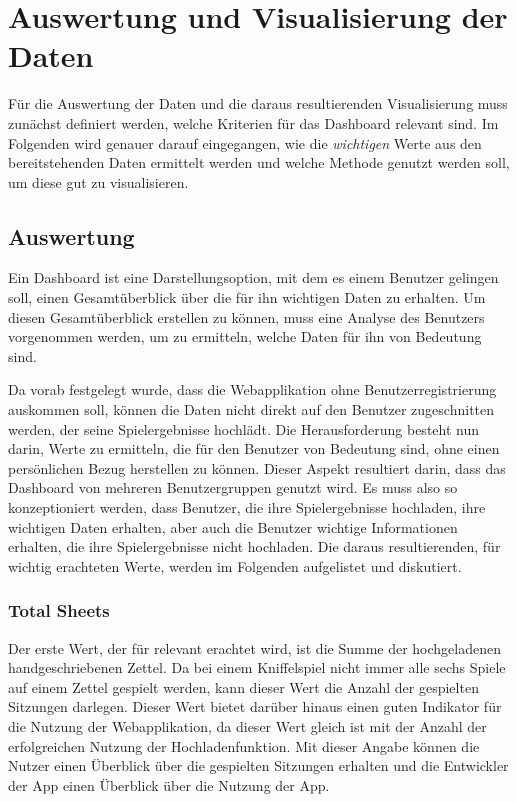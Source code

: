 \section{Auswertung und Visualisierung der Daten}
Für die Auswertung der Daten und die daraus resultierenden Visualisierung muss zunächst definiert werden, welche Kriterien für das Dashboard relevant sind. Im Folgenden wird genauer darauf eingegangen, wie die \textit{wichtigen} Werte aus den bereitstehenden Daten ermittelt werden und welche Methode genutzt werden soll, um diese gut zu visualisieren.

\subsection{Auswertung}
Ein Dashboard ist eine Darstellungsoption, mit dem es einem Benutzer gelingen soll, einen Gesamtüberblick über die für ihn wichtigen Daten zu erhalten. Um diesen Gesamtüberblick erstellen zu können, muss eine Analyse des Benutzers vorgenommen werden, um zu ermitteln, welche Daten für ihn von Bedeutung sind. \cite{few_2013}

Da vorab festgelegt wurde, dass die Webapplikation ohne Benutzerregistrierung auskommen soll, können die Daten nicht direkt auf den Benutzer zugeschnitten werden, der seine Spielergebnisse hochlädt. Die Herausforderung besteht nun darin, Werte zu ermitteln, die für den Benutzer von Bedeutung sind, ohne einen persönlichen Bezug herstellen zu können. Dieser Aspekt resultiert darin, dass das Dashboard von mehreren Benutzergruppen genutzt wird. Es muss also so konzeptioniert werden, dass Benutzer, die ihre Spielergebnisse hochladen, ihre wichtigen Daten erhalten, aber auch die Benutzer wichtige Informationen erhalten, die ihre Spielergebnisse nicht hochladen. Die daraus resultierenden, für wichtig erachteten Werte, werden im Folgenden aufgelistet und diskutiert.

\subsubsection{Total Sheets}
Der erste Wert, der für relevant erachtet wird, ist die Summe der hochgeladenen handgeschriebenen Zettel. Da bei einem Kniffelspiel nicht immer alle sechs Spiele auf einem Zettel gespielt werden, kann dieser Wert die Anzahl der gespielten Sitzungen darlegen. Dieser Wert bietet darüber hinaus einen guten Indikator für die Nutzung der Webapplikation, da dieser Wert gleich ist mit der Anzahl der erfolgreichen Nutzung der Hochladenfunktion. Mit dieser Angabe können die Nutzer einen Überblick über die gespielten Sitzungen erhalten und die Entwickler der App einen Überblick über die Nutzung der App.

